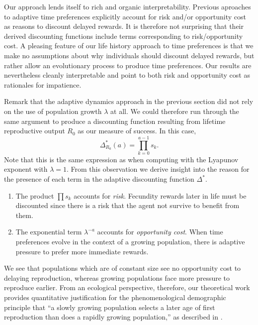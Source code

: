 \documentclass[titlepage, hidelinks, 12pt]{article}
\theoremstyle{plain}
\theoremstyle{remark}
\theoremstyle{definition}
\begin{document}
Our approach lends itself to rich and organic interpretability. Previous aproaches to adaptive time preferences \cite{sozou98, fawcett12} explicitly
account for risk and/or opportunity cost as reasons to discount delayed rewards. It is therefore not surprising that their derived discounting
functions include terms corresponding to risk/opportunity cost. A pleasing feature of our life history approach to time preferences is that
we make no assumptions about why individuals should discount delayed rewards, but rather allow an evolutionary process to produce time preferences.  
Our results are nevertheless cleanly interpretable and point to both risk and opportunity cost as rationales for impatience.  

Remark that the adaptive dynamics approach in the previous section did not rely on the use of population growth $\lambda$ at all. We could therefore
run through the same argument to produce a discounting function resulting from lifetime reproductive output $R_0$ as our measure of success. In this
case, 
\begin{equation}
    \Delta_{R_0}^*(a) = \prod\limits_{k = 0}^{a-1} s_k.
\end{equation}
Note that this is the same expression as when computing with the Lyapunov exponent with $\lambda = 1$. From this observation we derive insight into
the reason for the presence of each term in the adaptive discounting function $\Delta^*$. 
\begin{enumerate}
    \item The product $\prod s_k$ accounts for \textit{risk}. Fecundity rewards later in life must be discounted since there is a risk that the
        agent not survive to benefit from them.
    \item The exponential term $\lambda^{-a}$ accounts for \textit{opportunity cost}. When time preferences evolve in the context of a growing
        population, there is adaptive pressure to prefer more immediate rewards. 
\end{enumerate}

We see that populations which are of constant size see no opportunity cost to delaying
reproduction, whereas growing populations face more pressure to reproduce earlier. 
From an ecological perspective, therefore, our theoretical work provides quantitative justification for the phenomenological demographic principle that
``a slowly growing population selects a later age of first reproduction than does a rapidly growing population,'' as 
described in \cite{bull04}.  
\end{document}
